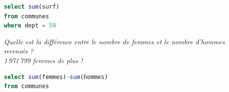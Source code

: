 \begin{Answer}
\begin{lstlisting}[language=SQL]
select sum(surf)
from communes
where dept = 59
\end{lstlisting}
\end{Answer}
\begin{Exercise}
\textit{Quelle est la différence entre le nombre de femmes et le nombre d'hommes recensés ?\\
1\,971\,799 femmes de plus !}
\end{Exercise}
\begin{Answer}
\begin{lstlisting}[language=SQL]
select sum(femmes)-sum(hommes)
from communes
\end{lstlisting}
\end{Answer}
\newpage
